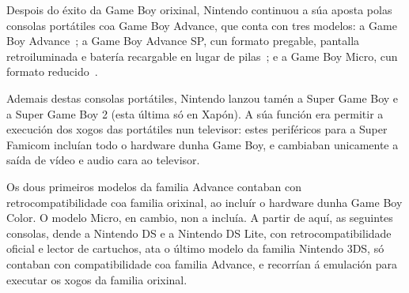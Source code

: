 Despois do éxito da Game Boy orixinal, Nintendo continuou a súa aposta polas consolas portátiles coa
Game Boy Advance, que conta con tres modelos: a Game Boy Advance~\cite{gameboyadvance};
a Game Boy Advance SP, cun formato pregable, pantalla retroiluminada e batería recargable en lugar de pilas~\cite{gameboyadvancesp};
e a Game Boy Micro, cun formato reducido~\cite{gameboymicro}.

Ademais destas consolas portátiles, Nintendo lanzou tamén a Super Game Boy e a Super Game Boy 2 (esta última só en Xapón).
A súa función era permitir a execución dos xogos das portátiles nun televisor:
estes periféricos para a Super Famicom incluían todo o hardware dunha Game Boy,
e cambiaban unicamente a saída de vídeo e audio cara ao televisor.

Os dous primeiros modelos da familia Advance contaban con retrocompatibilidade coa familia orixinal, ao incluír o hardware dunha
Game Boy Color. O modelo Micro, en cambio, non a incluía.
A partir de aquí, as seguintes consolas, dende a Nintendo DS e a Nintendo DS Lite,
con retrocompatibilidade oficial e lector de cartuchos,
ata o último modelo da familia Nintendo 3DS, só contaban con compatibilidade coa familia Advance,
e recorrían á emulación para executar os xogos da familia orixinal.


\begin{table}[hp!]
  \centering
  \caption{Familia Game Boy: modelos, especificacións principais e datas comerciais. Prezos de saída no mercado xaponés.}
  \label{tab:gb-modelos}
\end{table}

